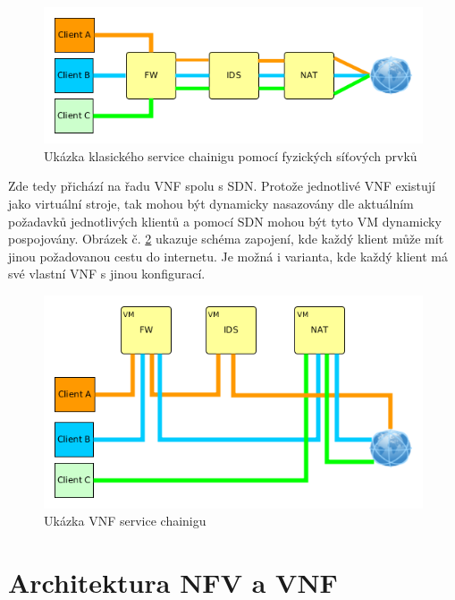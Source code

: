 \begin{figure}[h]
\begin{centering}
\includegraphics[scale=0.55]{images/service_chaining}
\par\end{centering}
\caption{Ukázka klasického service chainigu pomocí fyzických síťových prvků\label{fig:service_chaining}}
\end{figure}

Zde tedy přichází na řadu VNF spolu s SDN. Protože jednotlivé VNF existují jako virtuální stroje, tak mohou být dynamicky nasazovány dle aktuálním požadavků jednotlivých klientů a pomocí SDN mohou být tyto VM dynamicky pospojovány. Obrázek č. \ref{fig:service_chaining_new} ukazuje schéma zapojení, kde každý klient může mít jinou požadovanou cestu do internetu. Je možná i varianta, kde každý klient má své vlastní VNF s jinou konfigurací.

\begin{figure}[h]
\begin{centering}
\includegraphics[scale=0.55]{images/service_chaining_new}
\par\end{centering}
\caption{Ukázka VNF service chainigu\label{fig:service_chaining_new}}
\end{figure}

\section{Architektura NFV a VNF} \label{sub:architektura}

